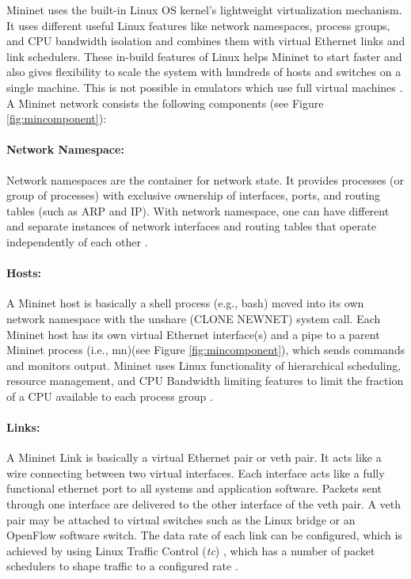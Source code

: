 Mininet uses the built-in Linux OS kernel's lightweight virtualization mechanism. It uses different useful Linux features like network namespaces, process groups, and CPU bandwidth isolation and combines them with virtual Ethernet links and link schedulers. These in-build features of Linux helps Mininet to start faster and also gives flexibility to scale the system with hundreds of hosts and switches on a single machine. This is not possible in emulators which use full virtual machines \cite{Lantz:2010:NLR:1868447.1868466}. A Mininet network consists the following components (see Figure \ref{fig:mincomponent}):

\paragraph{Network Namespace:}
Network namespaces are the container \cite{container} for network state. It provides processes (or group of processes) with exclusive ownership of interfaces, ports, and routing tables (such as ARP and IP). With network namespace, one can have different and separate instances of network interfaces and routing tables that operate independently of each other \cite{Handigol:2012:RNE:2413176.2413206}.

\paragraph{Hosts:}
A Mininet host is basically a shell process (e.g., bash) moved into its own network namespace with the unshare (CLONE NEWNET) system call. Each Mininet host has its own virtual Ethernet interface(s) and a pipe to a parent Mininet process (i.e., mn)(see Figure \ref{fig:mincomponent}), which sends commands and monitors output. Mininet uses Linux functionality of hierarchical scheduling, resource management, and CPU Bandwidth limiting features to limit the fraction of a CPU available to each process group \cite{cgroups-man} \cite{Handigol:2012:RNE:2413176.2413206}.

\paragraph{Links:}
A Mininet Link is basically a virtual Ethernet pair or veth pair\cite{container}. It acts like a wire connecting between two virtual interfaces. Each interface acts like a fully functional ethernet port to all systems and application software. Packets sent through one interface are delivered to the other interface of the veth pair. A veth pair may be attached to virtual switches such as the Linux bridge or an OpenFlow software switch. The data rate of each link can be configured, which is achieved by using Linux Traffic Control (\textit{tc}) \cite{tc-man}, which has a number of packet schedulers to shape traffic to a configured rate \cite{Handigol:2012:RNE:2413176.2413206}.

